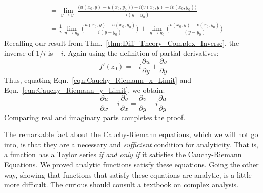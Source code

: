 \documentclass[crop=false,class=book,oneside]{standalone}
\begin{document}
\begin{bproof}
\begin{subequations}
\begin{align}
                        &=\underset{y\rightarrow{y_{0}}}{\lim}
                        \frac{\big(u(x_{0},y)-u(x_{0},y_{0})\big)+
                              i\big(v(x_{0},y)-iv(x_{0},y_{0})\big)}
                             {i(y-y_{0})}\\
                        &=\frac{1}{i}
                        \underset{y\rightarrow{y_{0}}}{\lim}
                        \Big(\frac{u(x_{0},y)-u(x_{0},y_{0})}
                                  {i(y-y_{0})}\Big)+
                        \underset{y\rightarrow{y_{0}}}{\lim}   
                        \Big(\frac{v(x_{0},y)-v(x_{0},y_{0})}
                                  {(y-y_{0})}\Big)
                    \end{align}
                \end{subequations}
                Recalling our result from
                Thm.~\ref{thm:Diff_Theory_Complex_Inverse}, the
                inverse of $1/i$ is $-i$. Again using the
                definition of partial derivatives:
                \begin{equation}
                    \label{eqn:Cauchy_Riemann_y_Limit}
                    f'(z_{0})=
                    -i\frac{\partial{u}}{\partial{y}}+
                    \frac{\partial{v}}{\partial{y}}
                \end{equation}
                Thus, equating
                Eqn.~\ref{eqn:Cauchy_Riemann_x_Limit} and
                Eqn.~\ref{eqn:Cauchy_Riemann_y_Limit}, we obtain:
                \begin{equation}
                    \frac{\partial{u}}{\partial{x}}+
                    i\frac{\partial{v}}{\partial{x}}=
                    \frac{\partial{v}}{\partial{y}}
                    -i\frac{\partial{u}}{\partial{y}}
                \end{equation}
                Comparing real and imaginary parts completes
                the proof.
            \end{bproof}
            The remarkable fact about the Cauchy-Riemann equations,
            which we will not go into, is that they are a
            necessary and \textit{sufficient}
            condition for analyticity. That is, a function has
            a Taylor series \textit{if and only if} it satisfies
            the Cauchy-Riemann Equations.
            We proved analytic functions
            satisfy these equations. Going the other way, showing
            that functions that satisfy these equations are
            analytic, is a little more difficult. The curious
            should consult a textbook on complex analysis.
\end{document}
